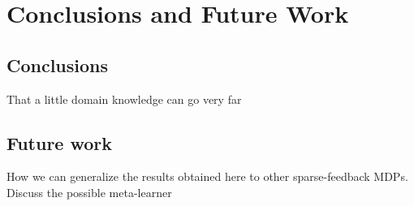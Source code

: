 \chapter{Conclusions and Future Work}
  \section{Conclusions}
  That a little domain knowledge can go very far
  \section{Future work}
  How we can generalize the results obtained here to other sparse-feedback MDPs.
  Discuss the possible meta-learner
